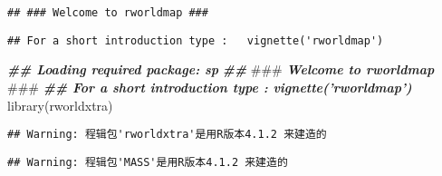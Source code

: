 \documentclass[
]{article}
\newenvironment{Shaded}{\begin{snugshade}}{\end{snugshade}}
\newcommand{\AlertTok}[1]{\textcolor[rgb]{0.94,0.16,0.16}{#1}}
\newcommand{\AttributeTok}[1]{\textcolor[rgb]{0.77,0.63,0.00}{#1}}
\newcommand{\DecValTok}[1]{\textcolor[rgb]{0.00,0.00,0.81}{#1}}
\newcommand{\DocumentationTok}[1]{\textcolor[rgb]{0.56,0.35,0.01}{\textbf{\textit{#1}}}}
\newcommand{\FloatTok}[1]{\textcolor[rgb]{0.00,0.00,0.81}{#1}}
\newcommand{\FunctionTok}[1]{\textcolor[rgb]{0.00,0.00,0.00}{#1}}
\newcommand{\NormalTok}[1]{#1}
\newcommand{\OtherTok}[1]{\textcolor[rgb]{0.56,0.35,0.01}{#1}}
\newcommand{\SpecialCharTok}[1]{\textcolor[rgb]{0.00,0.00,0.00}{#1}}
\newcommand{\StringTok}[1]{\textcolor[rgb]{0.31,0.60,0.02}{#1}}
\begin{document}
\begin{verbatim}
## ### Welcome to rworldmap ###
\end{verbatim}

\begin{verbatim}
## For a short introduction type :   vignette('rworldmap')
\end{verbatim}

\begin{Shaded}
\begin{Highlighting}[]
\DocumentationTok{\#\# Loading required package: sp}
\DocumentationTok{\#\# }\AlertTok{\#\#\#}\DocumentationTok{ Welcome to rworldmap }\AlertTok{\#\#\#}
\DocumentationTok{\#\# For a short introduction type : vignette(’rworldmap’)}
\FunctionTok{library}\NormalTok{(rworldxtra)}
\end{Highlighting}
\end{Shaded}

\begin{verbatim}
## Warning: 程辑包'rworldxtra'是用R版本4.1.2 来建造的
\end{verbatim}

\begin{Shaded}
\end{Shaded}

\begin{verbatim}
## Warning: 程辑包'MASS'是用R版本4.1.2 来建造的
\end{verbatim}
\end{document}
